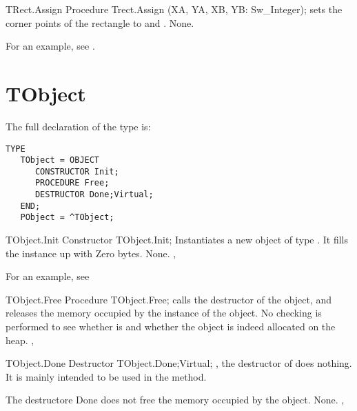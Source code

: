 \html{}

\begin{procedure}{TRect.Assign}
\Declaration
Procedure Trect.Assign (XA, YA, XB, YB: Sw\_Integer);
\Description
{} sets the corner points of the rectangle to  and 
.
\Errors
None.
\SeeAlso
{}
\end{procedure}

For an example, see .

\section{TObject}
\label{se:TObject}

The full declaration of the  type is:
\begin{verbatim}
TYPE
   TObject = OBJECT
      CONSTRUCTOR Init;
      PROCEDURE Free;
      DESTRUCTOR Done;Virtual;
   END;
   PObject = ^TObject;
\end{verbatim}
\begin{procedure}{TObject.Init}
\Declaration
Constructor TObject.Init;
\Description
Instantiates a new object of type . It fills the instance up
with Zero bytes.
\Errors
None.
\SeeAlso
{}, 
\end{procedure}

For an example, see 

\begin{procedure}{TObject.Free}
\Declaration
Procedure TObject.Free;
\Description
{} calls the destructor of the object, and releases the memory
occupied by the instance of the object.
\Errors
No checking is performed to see whether  is  and whether
the object is indeed allocated on the heap.
\SeeAlso
{}, 
\end{procedure}

\html{}

\begin{procedure}{TObject.Done}
\Declaration
Destructor TObject.Done;Virtual;
\Description
{}, the destructor of  does nothing. It is mainly
intended to be used in the  method.

The destructore Done does not free the memory occupied by the object.
\Errors
None.
\SeeAlso
{}, 
\end{procedure}

